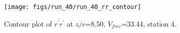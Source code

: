 \begin{figure}[H]
\centering
\texttt{[image: figs/run\_40/run\_40\_rr\_contour]}
\caption{Contour plot of $\overline{r^\prime r^\prime}$ at $z/c$=8.50, $V_{free}$=33.44, station 4.}
\label{fig:run_40_rr_contour}
\end{figure}


